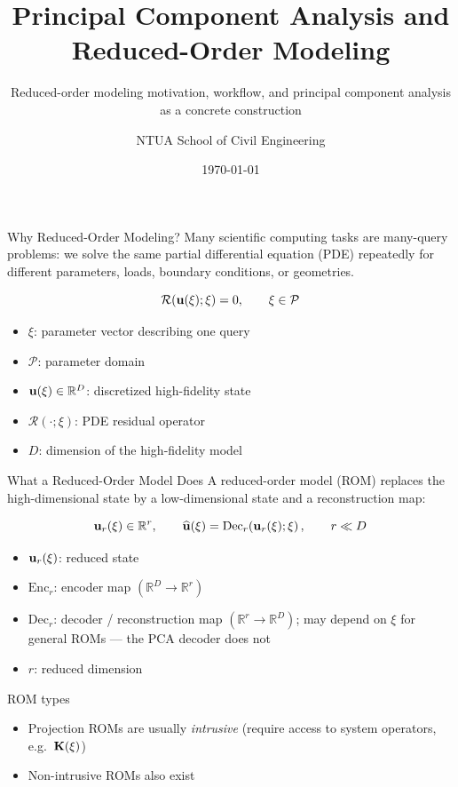\documentclass[10pt,aspectratio=169]{ntuabeamer}
\title{Principal Component Analysis and Reduced-Order Modeling}
\subtitle{Reduced-order modeling motivation, workflow, and principal component analysis as a concrete construction}
\author{NTUA School of Civil Engineering}
\date{\today}
\begin{document}
\begin{frame}[plain]
  \makepresentationtitle
\end{frame}


\begin{frame}{Why Reduced-Order Modeling?}
  \small
  Many scientific computing tasks are \textcolor{ntuablue}{many-query problems}: we solve the same partial differential equation (PDE) repeatedly for different parameters, loads, boundary conditions, or geometries.

  \[
    \mathcal{R}\!\left(\mathbf{u}(\xi); \xi\right) = 0,
    \qquad \xi \in \mathcal{P}
  \]

  \begin{itemize}
    \item \(\xi\): parameter vector describing one query
    \item \(\mathcal{P}\): parameter domain
    \item \(\mathbf{u}(\xi) \in \mathbb{R}^{D}\): discretized high-fidelity state
    \item \(\mathcal{R}(\cdot;\xi)\): PDE residual operator
    \item \(D\): dimension of the high-fidelity model
  \end{itemize}
\end{frame}

\begin{frame}{What a Reduced-Order Model Does}
  \small
  A reduced-order model (ROM) replaces the high-dimensional state by a low-dimensional state and a reconstruction map:

  \[
    \mathbf{u}_r(\xi)\in\mathbb{R}^{r},
    \qquad
    \widehat{\mathbf{u}}(\xi)=\mathrm{Dec}_r\!\left(\mathbf{u}_r(\xi);\xi\right),
    \qquad
    r \ll D
  \]

  \begin{itemize}
    \item \(\mathbf{u}_r(\xi)\): reduced state
    \item \(\mathrm{Enc}_r\): encoder map \((\mathbb{R}^D\to\mathbb{R}^r)\)
    \item \(\mathrm{Dec}_r\): decoder / reconstruction map \((\mathbb{R}^r\to\mathbb{R}^D)\);
          may depend on \(\xi\) for general ROMs --- the PCA decoder does not
    \item \(r\): reduced dimension
  \end{itemize}

  \vspace{0.3em}
  \textcolor{ntuablue}{ROM types}
  \begin{itemize}
    \item Projection ROMs are usually \emph{intrusive} (require access to system operators,
          e.g.\ \(\mathbf{K}(\xi)\))
    \item Non-intrusive ROMs also exist
  \end{itemize}
\end{frame}
\end{document}
